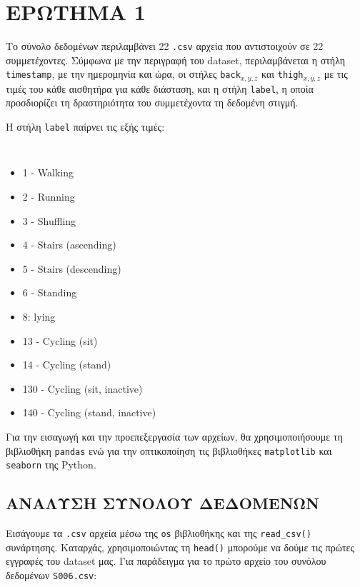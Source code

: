 \chapter{ΕΡΩΤΗΜΑ 1}
    Το σύνολο δεδομένων περιλαμβάνει 22 \texttt{.csv} αρχεία που αντιστοιχούν σε 22 συμμετέχοντες. Σύμφωνα με την περιγραφή του dataset,
    περιλαμβάνεται η στήλη \texttt{timestamp}, με την ημερομηνία και ώρα, οι στήλες \texttt{back}\(_{x,y,z}\) και \texttt{thigh}\(_{x,y,z}\)
    με τις τιμές του κάθε αισθητήρα για κάθε διάσταση, και η στήλη \texttt{label}, η οποία προσδιορίζει τη δραστηριότητα του συμμετέχοντα τη δεδομένη στιγμή.

    Η στήλη \texttt{label} παίρνει τις εξής τιμές:

    \vspace{-10pt}
    \begin{multicols}{2} \centering \tt
        \begin{itemize}[label={}]
            \addtolength\itemsep{-4mm}
            \item 1 - Walking
            \item 2 - Running
            \item 3 - Shuffling
            \item 4 - Stairs (ascending)
            \item 5 - Stairs (descending)
            \item 6 - Standing
            \item 8: lying
            \item 13 - Cycling (sit)
            \item 14 - Cycling (stand)
            \item 130 - Cycling (sit, inactive)
            \item 140 - Cycling (stand, inactive)
        \end{itemize}
    \end{multicols}
    \vspace{-10pt}

    Για την εισαγωγή και την προεπεξεργασία των αρχείων, θα χρησιμοποιήσουμε τη βιβλιοθήκη \texttt{pandas}
    ενώ για την οπτικοποίηση τις βιβλιοθήκες \texttt{matplotlib} και \texttt{seaborn} της Python.

    \section{ΑΝΑΛΥΣΗ ΣΥΝΟΛΟΥ ΔΕΔΟΜΕΝΩΝ}
        Εισάγουμε τα \texttt{.csv} αρχεία μέσω της \texttt{os} βιβλιοθήκης και της \texttt{read\_csv()} συνάρτησης.
        Καταρχάς, χρησιμοποιώντας τη \texttt{head()} μπορούμε να δούμε τις πρώτες εγγραφές του dataset μας.
        Για παράδειγμα για το πρώτο αρχείο του συνόλου δεδομένων \texttt{S006.csv}:

